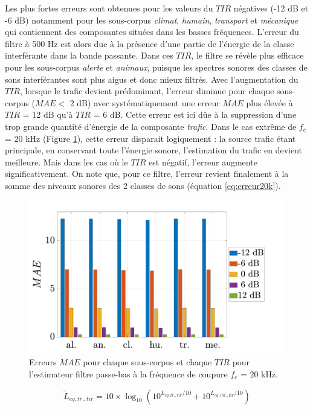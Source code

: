 Les plus fortes erreurs sont obtenues pour les valeurs du $TIR$ négatives (-12 dB et -6 dB) notamment pour les sous-corpus \textit{climat}, \textit{humain}, \textit{transport} et \textit{mécanique} qui contiennent des composantes situées dans les basses fréquences. L'erreur du filtre à 500 Hz est alors due à la présence d'une partie de l'énergie de la classe interférante dans la bande passante. Dans ces $TIR$, le filtre se révèle plus efficace pour les sous-corpus \textit{alerte} et \textit{animaux}, puisque les spectres sonores des classes de sons interférantes sont plus aigus et donc mieux filtrés.
Avec l'augmentation du $TIR$, lorsque le trafic devient prédominant, l'erreur diminue pour chaque sous-corpus ($MAE <$ 2 dB) avec systématiquement une erreur $MAE$ plus élevée à $TIR$ = 12 dB qu'à $TIR$ = 6 dB. Cette erreur est ici dûe à la suppression d'une trop grande quantité d'énergie de la composante \textit{trafic}. Dans le cas extrême de $f_c$ = 20 kHz (Figure \ref{fig:filtre_amb_tir_20k}), cette erreur disparait logiquement : la source trafic étant principale, en conservant toute l'énergie sonore, l'estimation du trafic en devient meilleure. Mais dans les cas où le $TIR$ est négatif, l'erreur augmente significativement. On note que, pour ce filtre, l'erreur revient finalement à la somme des niveaux sonores des 2 classes de sons (équation \ref{eq:erreur20k}).

\begin{figure}[h!]
\centering
\includegraphics[width=0.7\linewidth]{./figures/resultats/amb_filtre_20k_bar.pdf}
\caption{Erreurs $MAE$ pour chaque sous-corpus et chaque $TIR$ pour l'estimateur filtre passe-bas à la fréquence de coupure $f_c$ = 20 kHz.}
\label{fig:filtre_amb_tir_20k}
\end{figure}

\begin{equation}\label{eq:erreur20k}
\tilde{L}_{eq,tr.,tir} = 10\times \log_{10}\left(10^{L_{eq,tr.,tir}/10}+10^{L_{eq,int.,tir}/10}\right)
\end{equation}


